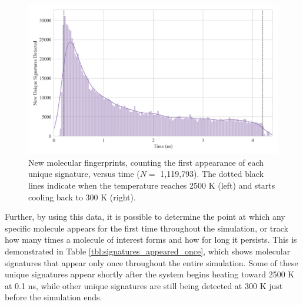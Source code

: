 \begin{figure}[!ht]
    \centering
    \includegraphics[width=1\linewidth]{Images/early_earth/unique_signature_vs_time.png}
    \caption[Molecular fingerprints throughout the Hero Run simulation]{New molecular fingerprints, counting the first appearance of each unique signature, versus time ($N=$ 1,119,793). The dotted black lines indicate when the temperature reaches 2500 K (left) and starts cooling back to 300 K (right).}
    \label{fig:unique_signatures}
\end{figure}

Further, by using this data, it is possible to determine the point at which any specific molecule appears for the first time throughout the simulation, or track how many times a molecule of interest forms and how for long it persists. 
This is demonstrated in Table \ref{tbl:signatures_appeared_once}, which shows molecular signatures that appear only once throughout the entire simulation. 
Some of these unique signatures appear shortly after the system begins heating toward 2500 K at 0.1 ns, while other unique signatures are still being detected at 300 K just before the simulation ends.

